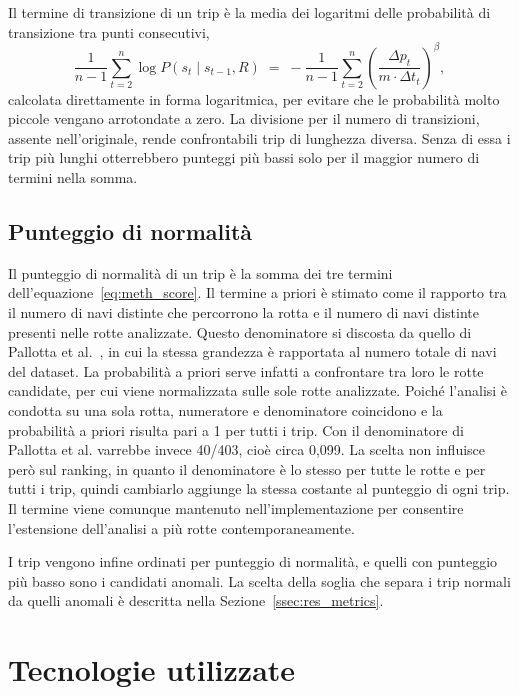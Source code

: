 Il termine di transizione di un trip è la media dei logaritmi delle probabilità di transizione tra
punti consecutivi,
\[
    \frac{1}{n-1} \sum_{t=2}^{n} \log P(s_t \mid s_{t-1}, R)
    \;=\; -\frac{1}{n-1} \sum_{t=2}^{n} {\left(\frac{\Delta p_t}{m \cdot \Delta t_t}\right)}^{\beta} ,
\]
calcolata direttamente in forma logaritmica, per evitare che le probabilità molto piccole vengano
arrotondate a zero. La divisione per il numero di transizioni, assente nell'originale, rende
confrontabili trip di lunghezza diversa. Senza di essa i trip più lunghi otterrebbero punteggi più
bassi solo per il maggior numero di termini nella somma.

\subsection{Punteggio di normalità}\label{ssec:meth_score}

Il punteggio di normalità di un trip è la somma dei tre termini
dell'equazione~\eqref{eq:meth_score}. Il termine a priori è stimato come il rapporto tra il numero di
navi distinte che percorrono la rotta e il numero di navi distinte presenti nelle rotte analizzate.
Questo denominatore si discosta da quello di Pallotta et al.~\cite{pallotta}, in cui la stessa grandezza è rapportata al numero
totale di navi del dataset. La probabilità a priori serve infatti a confrontare tra loro le rotte
candidate, per cui viene normalizzata sulle sole rotte analizzate.
Poiché l'analisi è condotta su una sola rotta, numeratore e denominatore coincidono e la
probabilità a priori risulta pari a 1 per tutti i trip. Con il denominatore di Pallotta et al.
varrebbe invece 40/403, cioè circa 0,099. La scelta non influisce però sul ranking, in quanto il
denominatore è lo stesso per tutte le rotte e per tutti i trip, quindi cambiarlo aggiunge
la stessa costante al punteggio di ogni trip. Il termine viene comunque mantenuto
nell'implementazione per consentire l'estensione dell'analisi a più rotte contemporaneamente.

I trip vengono infine ordinati per punteggio di normalità, e quelli con punteggio più basso sono
i candidati anomali. La scelta della soglia che separa i trip normali da quelli anomali è descritta
nella Sezione~\ref{ssec:res_metrics}.



\section{Tecnologie utilizzate}\label{sec:meth_technologies}

